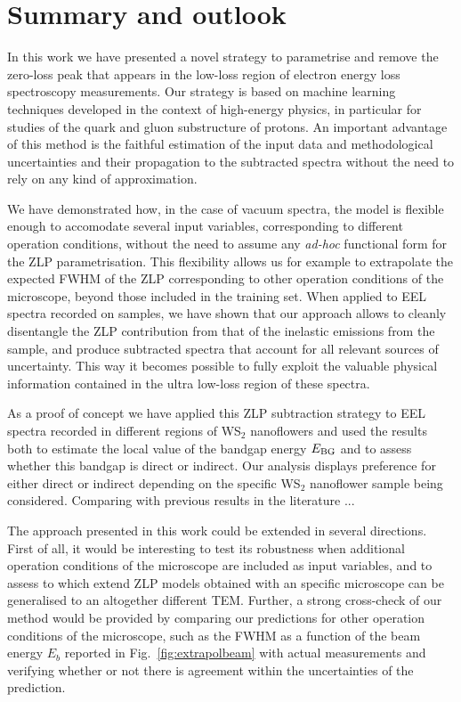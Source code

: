 \section{Summary and outlook}
\label{sec:summary}

In this work we have presented a novel strategy to parametrise and remove
the zero-loss peak that appears in the low-loss region
of electron energy loss spectroscopy measurements.
%
Our strategy is based on machine learning techniques developed
in the context of high-energy physics, in particular for studies of the quark
and gluon substructure of protons.
%
An important advantage of this method is the faithful estimation of the
input data and methodological uncertainties and their propagation to the subtracted
spectra without the need to rely on any kind of approximation.

We have demonstrated how, in the case of vacuum spectra, the model
is flexible enough to accomodate several input variables, corresponding
to different operation conditions,  without the need to
assume any {\it ad-hoc} functional form for the ZLP parametrisation.
%
This flexibility allows us for example to extrapolate the expected FWHM of the ZLP
corresponding to other operation conditions of the microscope, beyond those
included in the training set.
%
When applied to EEL spectra recorded on samples, we have shown
that our approach allows to cleanly disentangle the ZLP contribution from
that of the inelastic emissions from the sample, and produce
subtracted spectra  that account for all relevant sources of uncertainty.
%
This way it becomes possible to fully exploit
the valuable physical information contained in the ultra low-loss region of
these spectra.

As a proof of concept we have applied this ZLP subtraction
strategy to EEL spectra recorded in different regions of WS$_2$ nanoflowers
and used the results both to estimate the local value of the bandgap energy $E_{\rm BG}$
and to assess whether this bandgap is direct or indirect.
%
Our analysis displays preference for either  direct or indirect depending
on the specific WS$_2$ nanoflower sample being considered.
%
Comparing with previous results in the literature ...

The approach presented in this work could be extended
in several directions.
%
First of all, it would be interesting to test its robustness when additional
operation conditions of the microscope are included as input variables,
and to assess to which extend ZLP models obtained with an specific microscope
can be generalised to an altogether different TEM.
%
Further, a strong cross-check of our method would be provided by comparing
our predictions for other operation conditions of the microscope, such
as the FWHM as a function of the beam energy $E_b$ reported in Fig.~\ref{fig:extrapolbeam}
with actual measurements and verifying whether or not there is agreement within the
uncertainties of the prediction.

